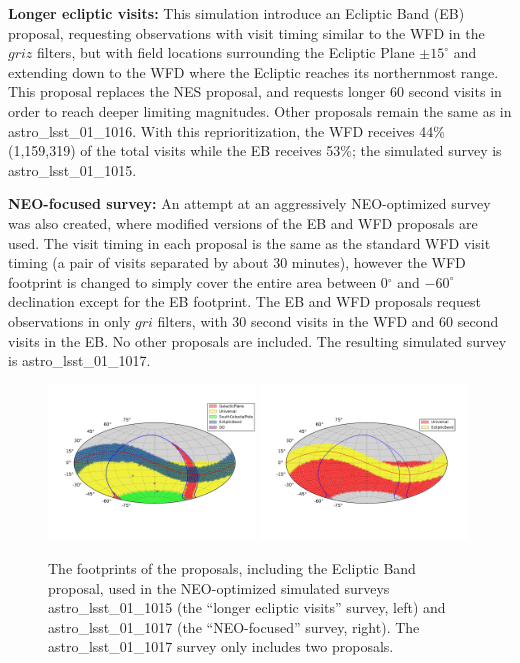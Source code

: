 \textbf{Longer ecliptic visits:} This simulation introduce an Ecliptic Band (EB) proposal, requesting observations with visit timing similar to the WFD in the $griz$ filters, but with field locations surrounding the Ecliptic Plane $\pm15^\circ$ and extending down to the WFD where the Ecliptic reaches its northernmost  range. This proposal replaces the NES proposal, and requests longer 60 second visits in order to reach deeper limiting magnitudes. Other proposals remain the same as in astro\_lsst\_01\_1016. With this reprioritization, the WFD receives 44\% (1,159,319) of the total visits while the EB receives 53\%; the simulated survey is astro\_lsst\_01\_1015.

\textbf{NEO-focused survey:} An attempt at an aggressively NEO-optimized survey was also created, where modified versions of the EB and WFD proposals are used. The visit timing in each proposal is the same as the standard WFD visit timing (a pair of visits separated by about 30 minutes), however the WFD footprint is changed to simply cover the entire area between 0$^\circ$ and $-60^\circ$ declination except for the EB footprint. The EB and WFD proposals request observations in only $gri$ filters, with 30 second visits in the WFD and 60 second visits in the EB. No other proposals are included. The resulting simulated survey is astro\_lsst\_01\_1017.

\begin{figure}[t!]
\centering
\includegraphics[width=0.49\textwidth]{figures/astro_lsst_01_1015_proposal_footprint}
\includegraphics[width=0.49\textwidth]{figures/astro_lsst_01_1017_proposal_footprint}
\vskip -0.5in
\caption{The footprints of the proposals, including the Ecliptic Band proposal, used in the NEO-optimized simulated surveys astro\_lsst\_01\_1015 (the ``longer ecliptic visits'' survey, left) and astro\_lsst\_01\_1017 (the ``NEO-focused'' survey, right). The astro\_lsst\_01\_1017 survey only includes two proposals.
\label{fig:neo_footprints}}
\end{figure}


